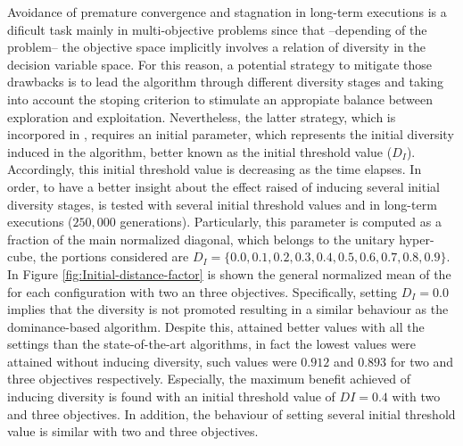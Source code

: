 Avoidance of premature convergence and stagnation in long-term executions is a dificult task mainly in multi-objective problems since that --depending of the problem-- the objective space implicitly involves a relation of diversity in the decision variable space.
%
For this reason, a potential strategy to mitigate those drawbacks is to lead the algorithm through different diversity stages and taking into account the stoping criterion to stimulate an appropiate balance between exploration and exploitation.
%
Nevertheless, the latter strategy, which is incorpored in \VSDMOEA{}, requires an initial parameter, which represents the initial diversity induced in the algorithm, better known as the initial threshold value ($D_I$).
%
Accordingly, this initial threshold value is decreasing as the time elapses.
%
In order, to have a better insight about the effect raised of inducing several initial diversity stages, \VSDMOEA{} is tested with several initial threshold values and in long-term executions ($250,000$ generations).
%
Particularly, this parameter is computed as a fraction of the main normalized diagonal, which belongs to the unitary hyper-cube, the portions considered are $D_I = \{0.0, 0.1, 0.2, 0.3, 0.4, 0.5, 0.6, 0.7, 0.8, 0.9\}$.
%
In Figure \ref{fig:Initial-distance-factor} is shown the general normalized mean of the \HV{} for each configuration with two an three objectives.
%
Specifically, setting $D_I=0.0$ implies that the diversity is not promoted resulting in a similar behaviour as the dominance-based algorithm.
%
Despite this, \VSDMOEA{} attained better \HV{} values with all the settings than the state-of-the-art algorithms, in fact the lowest values were attained without inducing diversity, such values were $0.912$ and $0.893$ for two and three objectives respectively.
%
Especially, the maximum benefit achieved of inducing diversity is found with an initial threshold value of $DI=0.4$ with two and three objectives.
%
In addition, the behaviour of setting several initial threshold value is similar with two and three objectives.
%



